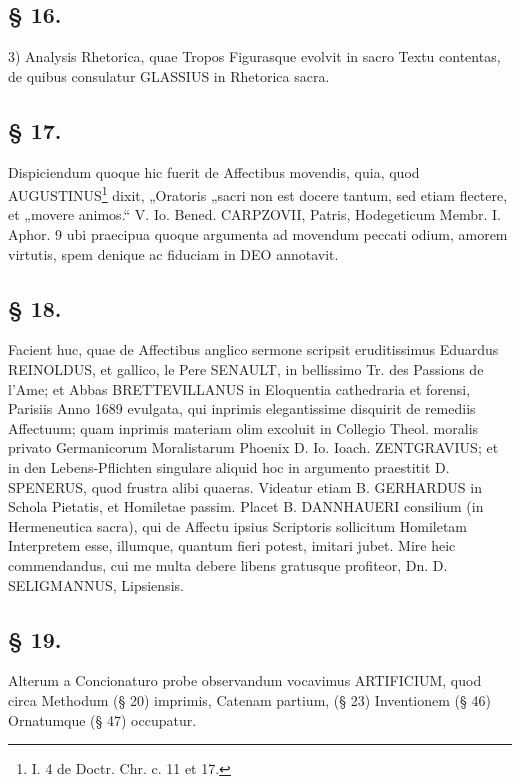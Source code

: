 \subsection*{§ 16.}

3) Analysis Rhetorica, quae Tropos Figurasque evolvit in sacro Textu contentas, de quibus consulatur GLASSIUS in Rhetorica sacra.

\subsection*{§ 17.}

Dispiciendum quoque hic fuerit de Affectibus movendis, quia, quod AUGUSTINUS\footnote{I. 4 de Doctr. Chr. c. 11 et 17.} dixit, „Oratoris „sacri non est docere tantum, sed etiam flectere, et „movere animos.“ V. Io. Bened. CARPZOVII, Patris, Hodegeticum Membr. I. Aphor. 9 ubi praecipua quoque argumenta ad movendum peccati odium, amorem virtutis, spem denique ac fiduciam in DEO annotavit.

\subsection*{§ 18.}

Facient huc, quae de Affectibus anglico sermone scripsit eruditissimus Eduardus REINOLDUS, et gallico, le Pere SENAULT, in bellissimo Tr. des Passions de l’Ame; et Abbas BRETTEVILLANUS in Eloquentia cathedraria et forensi, Parisiis Anno 1689 evulgata, qui inprimis elegantissime disquirit de remediis Affectuum; quam inprimis materiam olim excoluit in Collegio Theol. moralis privato Germanicorum Moralistarum Phoenix D. Io. Ioach. ZENTGRAVIUS; et in den Lebens-Pflichten singulare aliquid hoc in argumento praestitit D. SPENERUS, quod frustra alibi quaeras. Videatur etiam B. GERHARDUS in Schola Pietatis, et Homiletae passim. Placet B. DANNHAUERI consilium (in Hermeneutica sacra), qui de Affectu ipsius Scriptoris sollicitum Homiletam Interpretem esse, illumque, quantum fieri potest, imitari jubet. Mire heic commendandus, cui me multa debere libens gratusque profiteor, Dn. D. SELIGMANNUS, Lipsiensis.

\subsection*{§ 19.}

Alterum a Concionaturo probe observandum vocavimus ARTIFICIUM, quod circa Methodum (§ 20) imprimis, Catenam partium, (§ 23) Inventionem (§ 46) Ornatumque (§ 47) occupatur.

